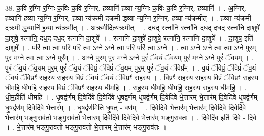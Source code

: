 \documentclass[17pt]{extarticle}
\begin{document}
38. क॒वि र॒ग्नि र॒ग्निः क॒विः क॒वि र॒ग्निर्. ह॒व्यानि॑ ह॒व्या न्य॒ग्निः क॒विः क॒वि र॒ग्निर्. ह॒व्यानि॑ । . अ॒ग्निर्. ह॒व्यानि॑ ह॒व्या न्य॒ग्नि र॒ग्निर्. ह॒व्या न्य॑क्रमी दक्रमी द्ध॒व्या न्य॒ग्नि र॒ग्निर्. ह॒व्या न्य॑क्रमीत् । . ह॒व्या न्य॑क्रमी दक्रमी द्ध॒व्यानि॑ ह॒व्या न्य॑क्रमीत् । . अ॒क्र॒मी॒दित्य॑क्रमीत् । . दध॒द् रत्ना॑नि॒ रत्ना॑नि॒ दध॒द् दध॒द् रत्ना॑नि दा॒शुषे॑ दा॒शुषे॒ रत्ना॑नि॒ दध॒द् दध॒द् रत्ना॑नि दा॒शुषे᳚ । . रत्ना॑नि दा॒शुषे॑ दा॒शुषे॒ रत्ना॑नि॒ रत्ना॑नि दा॒शुषे᳚ । . दा॒शुष॒ इति॑ दा॒शुषे᳚ । . परि॑ त्वा त्वा॒ परि॒ परि॑ त्वा ऽग्ने ऽग्ने त्वा॒ परि॒ परि॑ त्वा ऽग्ने । . त्वा॒ ऽग्ने॒ ऽग्ने॒ त्वा॒ त्वा॒ ऽग्ने॒ पुर॒म् पुर॑ मग्ने त्वा त्वा ऽग्ने॒ पुर᳚म् । . अ॒ग्ने॒ पुर॒म् पुर॑ मग्ने ऽग्ने॒ पुरं॑ ॅव॒यं ॅव॒यम् पुर॑ मग्ने ऽग्ने॒ पुरं॑ ॅव॒यम् । . पुरं॑ ॅव॒यं ॅव॒यम् पुर॒म् पुरं॑ ॅव॒यं ॅविप्रं॒ ॅविप्रं॑ ॅव॒यम् पुर॒म् पुरं॑ ॅव॒यं ॅविप्र᳚म् । . व॒यं ॅविप्रं॒ ॅविप्रं॑ ॅव॒यं ॅव॒यं ॅविप्रꣳ॑ सहस्य सहस्य॒ विप्रं॑ ॅव॒यं ॅव॒यं ॅविप्रꣳ॑ सहस्य । . विप्रꣳ॑ सहस्य सहस्य॒ विप्रं॒ ॅविप्रꣳ॑ सहस्य धीमहि धीमहि सहस्य॒ विप्रं॒ ॅविप्रꣳ॑ सहस्य धीमहि । . स॒ह॒स्य॒ धी॒म॒हि॒ धी॒म॒हि॒ स॒ह॒स्य॒ स॒ह॒स्य॒ धी॒म॒हि॒ । . धी॒म॒हीति॑ धीमहि । . धृ॒षद्व॑र्णम् दि॒वेदि॑वे दि॒वेदि॑वे धृ॒षद्व॑र्णम् धृ॒षद्व॑र्णम् दि॒वेदि॑वे भे॒त्तार॑म् भे॒त्तार॑म् दि॒वेदि॑वे धृ॒षद्व॑र्णम् धृ॒षद्व॑र्णम् दि॒वेदि॑वे भे॒त्तार᳚म् । . धृ॒षद्व॑र्ण॒मिति॑ धृ॒षत् - व॒र्ण॒म् । . दि॒वेदि॑वे भे॒त्तार॑म् भे॒त्तार॑म् दि॒वेदि॑वे दि॒वेदि॑वे भे॒त्तार॑म् भङ्गु॒राव॑तो भङ्गु॒राव॑तो भे॒त्तार॑म् दि॒वेदि॑वे दि॒वेदि॑वे भे॒त्तार॑म् भङ्गु॒राव॑तः । . दि॒वेदि॑व॒ इति॑ दि॒वे - दि॒वे॒ । . भे॒त्तार॑म् भङ्गु॒राव॑तो भङ्गु॒राव॑तो भे॒त्तार॑म् भे॒त्तार॑म् भङ्गु॒राव॑तः । \newline
\end{document}
